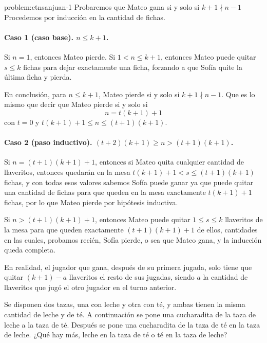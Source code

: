 \begin{solutiontoproblem}{problem:ctnsanjuan-1}
	Probaremos que Mateo gana si y solo si $k + 1 \nmid n - 1$
	Procedemos por inducción en la cantidad de fichas.
	\paragraph{Caso 1 (caso base). $n \leq k + 1$. }
	Si $n = 1$, entonces Mateo pierde.
	Si $1 < n \leq k + 1$,
	entonces Mateo puede quitar $s \leq k$
	fichas para dejar exactamente una ficha,
	forzando a que Sofía quite la última ficha y pierda.

	En conclusión, para $n \leq k + 1$, Mateo pierde
	si y solo si $k + 1 \nmid n - 1$.
	Que es lo mismo que decir que
	Mateo pierde si y solo si
	\[n = t(k + 1) + 1\]
	con $t = 0$ y $t(k + 1) + 1 \leq n \leq (t + 1)(k + 1)$.

	\paragraph{Caso 2 (paso inductivo). $(t + 2)(k + 1) \geq n > (t + 1)(k + 1)$.}
	Si $n = (t + 1)(k + 1) + 1$,
	entonces si Mateo quita cualquier cantidad de llaveritos,
	entonces quedarán en la mesa $t(k + 1) + 1 < s \leq (t + 1)(k + 1)$
	fichas, y con todas esos valores sabemos Sofía puede ganar
	ya que puede quitar una cantidad de fichas para que queden
	en la mesa exactamente $t(k + 1) + 1$ fichas,
	por lo que Mateo pierde por hipótesis inductiva.

	Si $n > (t + 1)(k + 1) + 1$, entonces Mateo puede quitar $1 \leq s \leq k$
	llaveritos de la mesa para que queden exactamente $(t + 1)(k + 1) + 1$
	de ellos, cantidades en las cuales, probamos recién, Sofía
	pierde, o sea que Mateo gana, y la inducción queda completa.

	\begin{remark}
		En realidad, el jugador que gana, después de
		su primera jugada, solo tiene que quitar $(k + 1) - a$
		llaveritos el resto de sus jugadas,
		siendo $a$ la cantidad de llaveritos que
		jugó el otro jugador en el turno anterior.
	\end{remark}
\end{solutiontoproblem}

\begin{problem}
Se disponen dos tazas, una con leche y otra con té,
y ambas tienen la misma cantidad de leche y de té.
A continuación se pone una cucharadita de la taza de
leche a la taza de té. Después se pone una cucharadita
de la taza de té en la taza de leche.
¿Qué hay más, leche en la taza de té o té en la taza de leche?
\end{problem}
